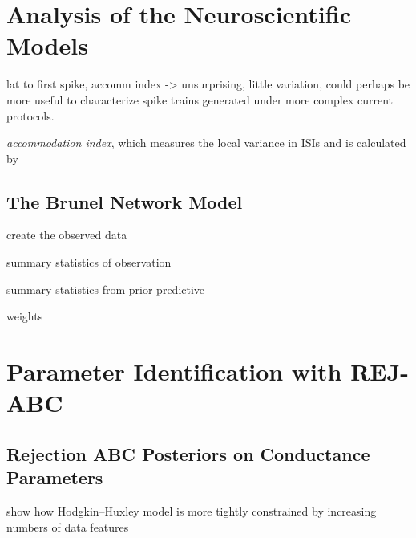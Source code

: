 \chapter{Analysis of the Neuroscientific Models}

lat to first spike, accomm index -> unsurprising, little variation, could perhaps be more useful to characterize spike trains generated under more complex current protocols. 




\textit{accommodation index}, which measures the local variance in ISIs and is calculated by






\section{The Brunel Network Model}

create the observed data

summary statistics of observation 

summary statistics from prior predictive

weights


\chapter{Parameter Identification with REJ-ABC}

\section{Rejection ABC Posteriors on Conductance Parameters}

show how Hodgkin–Huxley model is more tightly constrained by increasing numbers of data features

